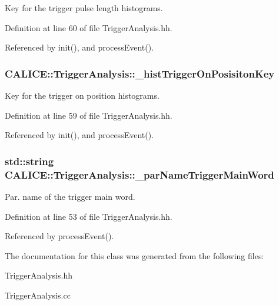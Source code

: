 Key for the trigger pulse length histograms. 

Definition at line 60 of file TriggerAnalysis.hh.

Referenced by init(), and processEvent().
\subsubsection[{\_\-histTriggerOnPosisitonKey}]{ {\bf CALICE::TriggerAnalysis::\_\-histTriggerOnPosisitonKey}\hspace{0.3cm}{\ttfamily  [private]}}\label{classCALICE_1_1TriggerAnalysis_a9e02480c102f82efe0629255b7bc1bd3}


Key for the trigger on position histograms. 

Definition at line 59 of file TriggerAnalysis.hh.

Referenced by init(), and processEvent().
\subsubsection[{\_\-parNameTriggerMainWord}]{\setlength{\rightskip}{0pt plus 5cm}std::string {\bf CALICE::TriggerAnalysis::\_\-parNameTriggerMainWord}\hspace{0.3cm}{\ttfamily  [private]}}\label{classCALICE_1_1TriggerAnalysis_a4601167e6fe8aa42e2336a893bf83a21}


Par. name of the trigger main word. 

Definition at line 53 of file TriggerAnalysis.hh.

Referenced by processEvent().

The documentation for this class was generated from the following files:\begin{DoxyCompactItemize}
\item 
TriggerAnalysis.hh\item 
TriggerAnalysis.cc\end{DoxyCompactItemize}
